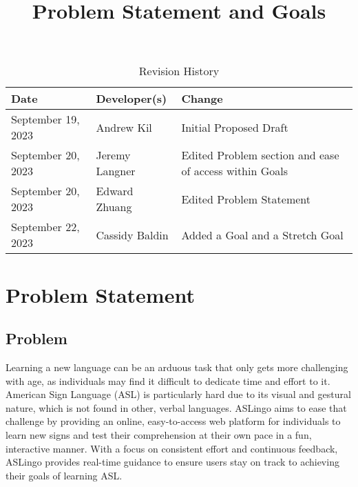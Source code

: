 \documentclass{article}
\title{Problem Statement and Goals\\\progname}
\author{\authname}
\date{}
\begin{document}
\maketitle

\begin{table}[hp]
\caption{Revision History} \label{TblRevisionHistory}
\begin{tabularx}{\textwidth}{llX}
\toprule
\textbf{Date} & \textbf{Developer(s)} & \textbf{Change}\\
\midrule
September 19, 2023 & Andrew Kil & Initial Proposed Draft\\
September 20, 2023 & Jeremy Langner & Edited Problem section and ease of access within Goals\\
September 20, 2023 & Edward Zhuang & Edited Problem Statement\\
September 22, 2023 & Cassidy Baldin & Added a Goal and a Stretch Goal\\
\bottomrule
\end{tabularx}
\end{table}

\section{Problem Statement}



\subsection{Problem}

Learning a new language can be an arduous task that only gets more challenging with age, as individuals may find it difficult to dedicate time and effort to it. American Sign Language (ASL) is particularly hard due to its visual and gestural nature, which is not found in other, verbal languages. ASLingo aims to ease that challenge by providing an online, easy-to-access web platform for individuals to learn new signs and test their comprehension at their own pace in a fun, interactive manner. With a focus on consistent effort and continuous feedback, ASLingo provides real-time guidance to ensure users stay on track to achieving their goals of learning ASL.
\end{document}
